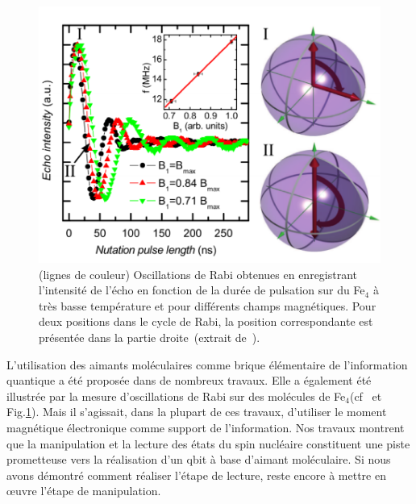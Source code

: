 \begin{figure}[h!]
\parbox{7cm}{
\includegraphics[scale=0.45]{Conclusion/OscilFe4/OscilFe4.pdf} 
}
\parbox{6.5cm}{\caption{(lignes de couleur) Oscillations de Rabi obtenues en enregistrant l'intensité de l'écho en fonction de la durée de pulsation sur du Fe$_4$ à très basse température et pour différents champs magnétiques. Pour deux positions dans le cycle de Rabi, la position correspondante est présentée dans la partie droite~(extrait de~\cite{Schlegel2008}).}
\label{OscilFe4}
}
\end{figure}

L'utilisation des aimants moléculaires comme brique élémentaire de l'information quantique a été proposée dans de nombreux travaux. Elle a également été illustrée par la mesure d'oscillations de Rabi sur des molécules de Fe$_{4}$(cf~\cite{Schlegel2008} et Fig.\ref{OscilFe4}). Mais il s'agissait, dans la plupart de ces travaux, d'utiliser le moment magnétique électronique comme support de l'information. Nos travaux montrent que la manipulation et la lecture des états du spin nucléaire constituent une piste prometteuse vers la réalisation d'un qbit à base d'aimant moléculaire. Si nous avons démontré comment réaliser l’étape de lecture, reste encore à mettre en œuvre l’étape de manipulation. 


